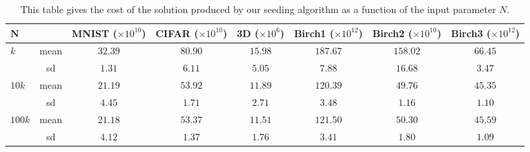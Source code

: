 \begin{table}[h]
\centering
\begin{tabular}{| l | c | c | c | c | c | c | c |}
\hline
 $\mathbf{N}$ & & \pbox{2cm}{{\bf MNIST} \\\tiny($\times 10^{10}$)} & \pbox{2cm}{{\bf CIFAR} \\ \tiny{($\times 10^{10}$)}} & \pbox{2cm}{{\bf 3D} \\ \tiny{($\times 10^6$)}} & \pbox{2cm}{{\bf Birch1} \\ \tiny{($\times 10^{12}$)}} & \pbox{2cm}{{\bf Birch2} \\\tiny{($\times 10^{10}$)}} & \pbox{2cm}{{\bf Birch3} \\ \tiny{($\times 10^{12}$)}} \\
\hline \hline
\multirow{2}{*}{$k$} & mean & $32.39$ & $80.90$ & $15.98$ & $187.67$ & $158.02$ & $66.45$\\ \cline{2-8}
& \small{sd} & ${\scriptstyle 1.31}$ & ${\scriptstyle 6.11}$ & ${\scriptstyle 5.05}$ & ${\scriptstyle 7.88}$ & ${\scriptstyle 16.68}$ & ${\scriptstyle 3.47}$\\
\hline \hline 
\multirow{2}{*}{$10k$} & mean & $21.19$ & $53.92$ & $11.89$ & $120.39$ & $49.76$ & $45.35$\\ \cline{2-8}
& \small{sd} & ${\scriptstyle 4.45}$ & ${\scriptstyle 1.71}$ & ${\scriptstyle 2.71}$ & ${\scriptstyle 3.48}$ & ${\scriptstyle 1.16}$ & ${\scriptstyle 1.10}$\\
\hline \hline 
\multirow{2}{*}{$100k$} & mean & $21.18$ & $53.37$ & $11.51$ & $121.50$ & $50.30$ & $45.59$\\ \cline{2-8}
& \small{sd} & ${\scriptstyle 4.12}$ & ${\scriptstyle 1.37}$ & ${\scriptstyle 1.76}$ & ${\scriptstyle 3.41}$ & ${\scriptstyle 1.80}$ & ${\scriptstyle 1.09}$\\
\hline 
\end{tabular}
\caption{This table gives the cost of the solution produced by our seeding algorithm as a function of the input parameter $N$.}
\label{table:2}
\end{table}